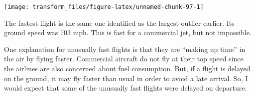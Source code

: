 \documentclass[]{book}
\newenvironment{Shaded}{\begin{snugshade}}{\end{snugshade}}
\newcommand{\CommentTok}[1]{\textcolor[rgb]{0.56,0.35,0.01}{\textit{#1}}}
\newcommand{\DataTypeTok}[1]{\textcolor[rgb]{0.13,0.29,0.53}{#1}}
\newcommand{\DecValTok}[1]{\textcolor[rgb]{0.00,0.00,0.81}{#1}}
\newcommand{\KeywordTok}[1]{\textcolor[rgb]{0.13,0.29,0.53}{\textbf{#1}}}
\newcommand{\NormalTok}[1]{#1}
\newcommand{\OperatorTok}[1]{\textcolor[rgb]{0.81,0.36,0.00}{\textbf{#1}}}
\newcommand{\StringTok}[1]{\textcolor[rgb]{0.31,0.60,0.02}{#1}}
\theoremstyle{plain}
\theoremstyle{remark}
\begin{document}
\begin{Shaded}
\end{Shaded}

\begin{center}\texttt{[image: transform\_files/figure-latex/unnamed-chunk-97-1]} \end{center}

The fastest flight is the same one identified as the largest outlier earlier.
Its ground speed was 703 mph.
This is fast for a commercial jet, but not impossible.

\begin{Shaded}
\end{Shaded}

One explanation for unusually fast flights is that they are ``making up time'' in the air by flying faster.
Commercial aircraft do not fly at their top speed since the airlines are also concerned about fuel consumption.
But, if a flight is delayed on the ground, it may fly faster than usual in order to avoid a late arrival.
So, I would expect that some of the unusually fast flights were delayed on departure.
\end{document}

